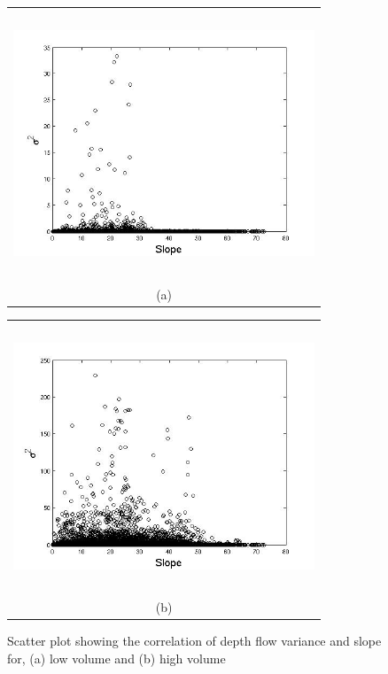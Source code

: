 \documentclass[a4paper,fleqn]{article}
\begin{document}
\begin{figure}[H]
    \begin{minipage}[b]{0.6\textwidth}
        \begin{tabular}{c}
        \includegraphics[width=9cm,height=8cm,keepaspectratio]{slope_vs_sigma2_res.jpg}\\
        (a)
        \end{tabular}
    \end{minipage}
    \begin{minipage}{0.6\textwidth}
        \begin{tabular}{c}
        \includegraphics[width=9cm,height=8cm,keepaspectratio]{slope_vs_sigma2_high_vol_res.jpg}\\
        (b)
        \end{tabular}
    \end{minipage} 
\caption{Scatter plot showing the correlation of depth flow variance and slope for, (a) low volume and (b) high volume}
\label{fig6}  
\end{figure}
\end{document}
